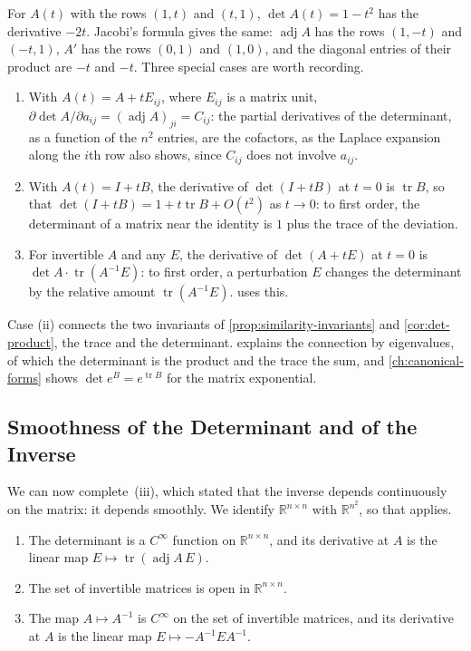 For $A(t)$ with the rows $(1,t)$ and $(t,1)$, $\det A(t)=1-t^2$ has the derivative $-2t$. Jacobi's formula gives the same: $\operatorname{adj}A$ has the rows $(1,-t)$ and $(-t,1)$, $A'$ has the rows $(0,1)$ and $(1,0)$, and the diagonal entries of their product are $-t$ and $-t$. Three special cases are worth recording.
\begin{enumerate}
\item With $A(t)=A+tE_{ij}$, where $E_{ij}$ is a matrix unit, $\partial\det A/\partial a_{ij}=(\operatorname{adj}A)_{ji}=C_{ij}$: the partial derivatives of the determinant, as a function of the $n^2$ entries, are the cofactors, as the Laplace expansion along the $i$th row also shows, since $C_{ij}$ does not involve $a_{ij}$.
\item With $A(t)=I+tB$, the derivative of $\det(I+tB)$ at $t=0$ is $\operatorname{tr}B$, so that $\det(I+tB)=1+t\operatorname{tr}B+O(t^2)$ as $t\to0$: to first order, the determinant of a matrix near the identity is $1$ plus the trace of the deviation.
\item For invertible $A$ and any $E$, the derivative of $\det(A+tE)$ at $t=0$ is $\det A\cdot\operatorname{tr}(A^{-1}E)$: to first order, a perturbation $E$ changes the determinant by the relative amount $\operatorname{tr}(A^{-1}E)$.  uses this.
\end{enumerate}
Case (ii) connects the two invariants of \cref{prop:similarity-invariants} and \cref{cor:det-product}, the trace and the determinant.  explains the connection by eigenvalues, of which the determinant is the product and the trace the sum, and \cref{ch:canonical-forms} shows $\det e^B=e^{\operatorname{tr}B}$ for the matrix exponential.

\subsection{Smoothness of the Determinant and of the Inverse}

We can now complete \,(iii), which stated that the inverse depends continuously on the matrix: it depends smoothly. We identify $\mathbb R^{n\times n}$ with $\mathbb R^{n^2}$, so that  applies.

\begin{theorem}
\label{thm:det-smooth}
\leavevmode
\begin{enumerate}
\item The determinant is a $C^\infty$ function on $\mathbb R^{n\times n}$, and its derivative at $A$ is the linear map $E\mapsto\operatorname{tr}(\operatorname{adj}A\,E)$.
\item The set of invertible matrices is open in $\mathbb R^{n\times n}$.
\item The map $A\mapsto A^{-1}$ is $C^\infty$ on the set of invertible matrices, and its derivative at $A$ is the linear map $E\mapsto-A^{-1}EA^{-1}$.
\end{enumerate}
\end{theorem}


